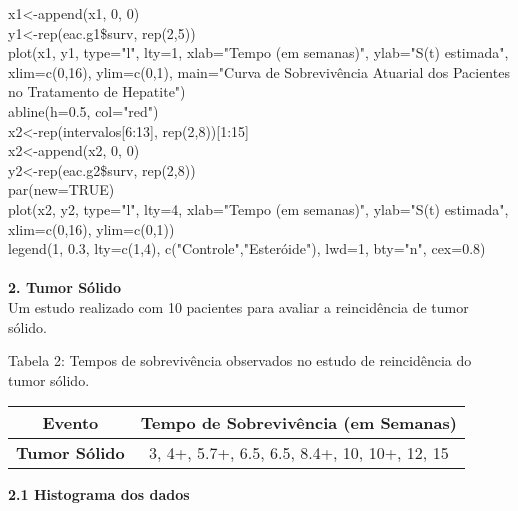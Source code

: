 \documentclass[12pt,a4paper]{article}
\begin{document}
	x1<-append(x1, 0, 0)\\
	y1<-rep(eac.g1\$surv, rep(2,5))\\
	plot(x1, y1, type="l", lty=1, xlab="Tempo (em semanas)", ylab="S(t) estimada", xlim=c(0,16), ylim=c(0,1), main="Curva de Sobrevivência Atuarial dos Pacientes no Tratamento de Hepatite")\\
	abline(h=0.5, col="red")\\
	x2<-rep(intervalos[6:13], rep(2,8))[1:15]\\
	x2<-append(x2, 0, 0)\\
	y2<-rep(eac.g2\$surv, rep(2,8))\\
	par(new=TRUE)\\
	plot(x2, y2, type="l", lty=4,  xlab="Tempo (em semanas)", ylab="S(t) estimada", xlim=c(0,16), ylim=c(0,1))\\
	legend(1, 0.3, lty=c(1,4), c("Controle","Esteróide"), lwd=1, bty="n", cex=0.8)\\
	\vspace{1cm}\\
	\textbf{2. Tumor Sólido}
	\vspace{1cm}\\
	Um estudo realizado com 10 pacientes para avaliar a reincidência de tumor sólido.
	\begin{center}
		\small{Tabela 2: Tempos de sobrevivência observados no estudo de reincidência do tumor sólido.}\\
		\begin{tabular}{|c|c|}\hline
			\textbf{Evento} & \textbf{Tempo de Sobrevivência (em Semanas)}\\ \hline
			\textbf{Tumor Sólido}& 3, 4+, 5.7+, 6.5, 6.5, 8.4+, 10, 10+, 12, 15\\ \hline
		\end{tabular}
	\end{center}
	\vspace{1cm}
	\textbf{2.1 Histograma dos dados}
\end{document}
